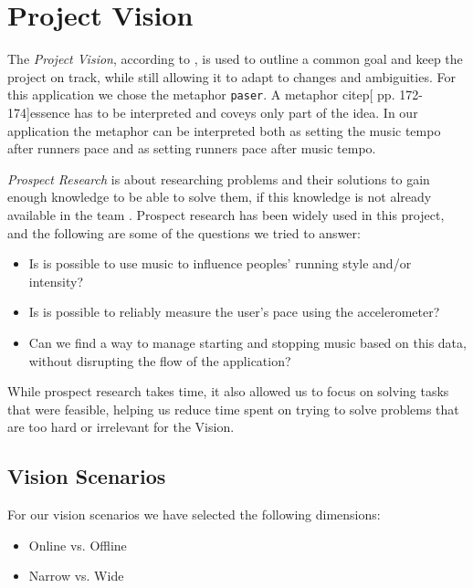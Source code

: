 \section{Project Vision}
The \textit{Project Vision}, according to \citet[ p. 104]{essence}, is used to outline a common goal and keep the project on track, while still allowing it to adapt to changes and ambiguities.
For this application we chose the metaphor \texttt{paser}. A metaphor citep[ pp. 172-174]{essence} has to be interpreted and coveys only part of the idea. In our application the metaphor can be interpreted both as setting the music tempo after runners pace and as setting runners pace after music tempo. 

\noindent \textit{Prospect Research} is about researching problems and their solutions to gain enough knowledge to be able to solve them, if this knowledge is not already available in the team \citep[ pp. 104-105]{essence}.
Prospect research has been widely used in this project, and the following are some of the questions we tried to answer:

\begin{itemize}
	\item Is is possible to use music to influence peoples' running style and/or intensity?
	\item Is is possible to reliably measure the user's pace using the accelerometer?
	\item Can we find a way to manage starting and stopping music based on this data, without disrupting the flow of the application?
\end{itemize}

While prospect research takes time, it also allowed us to focus on solving tasks that were feasible, helping us reduce time spent on trying to solve problems that are too hard or irrelevant for the Vision.

\subsection*{Vision Scenarios}
For our vision scenarios \cite[ p. 127]{essence} we have selected the following dimensions:
\begin{itemize}
\item Online vs. Offline %
\item Narrow vs. Wide
\end{itemize}

